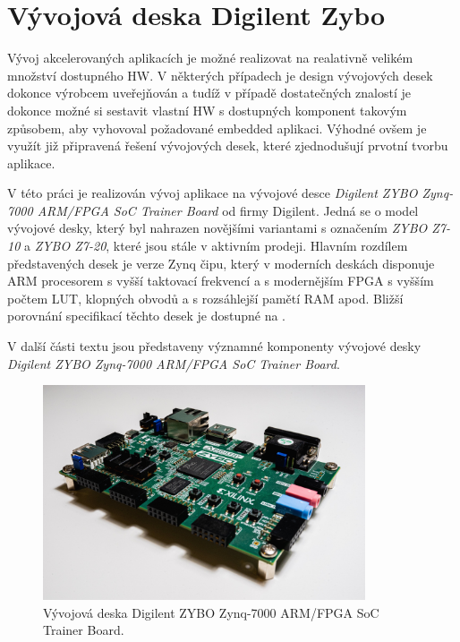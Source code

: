 \documentclass[a4paper, twoside, 11pt]{article}
\begin{document}
	\section{Vývojová deska Digilent Zybo}
			Vývoj akcelerovaných aplikacích je možné realizovat na realativně velikém množství dostupného HW. V některých případech je design vývojových desek dokonce výrobcem uveřejňován a tudíž v případě dostatečných znalostí je dokonce možné si sestavit vlastní HW s dostupných komponent takovým způsobem, aby vyhovoval požadované embedded aplikaci. Výhodné ovšem je využít již připravená řešení vývojových desek, které zjednodušují prvotní tvorbu aplikace.\par
			V této práci je realizován vývoj aplikace na vývojové desce \textit{Digilent ZYBO Zynq-7000 ARM/FPGA SoC Trainer Board} od firmy Digilent. \cite{digilent-zybo-7000-docs} Jedná se o model vývojové desky, který byl nahrazen novějšími variantami s označením \textit{ZYBO Z7-10} a \textit{ZYBO Z7-20}, které jsou stále v aktivním prodeji. Hlavním rozdílem představených desek je verze Zynq čipu, který v moderních deskách disponuje ARM procesorem s vyšší taktovací frekvencí a s modernějším FPGA s vyšším počtem LUT, klopných obvodů a s rozsáhlejší pamětí RAM apod. Bližší porovnání specifikací těchto desek je dostupné na \cite{digilent-zybo-compare}.\par
			V další části textu jsou představeny významné komponenty vývojové desky \textit{Digilent ZYBO Zynq-7000 ARM/FPGA SoC Trainer Board}.

			\begin{figure}[htbp!]
				\centering
					\includegraphics[width=0.85\textwidth]{src/jpg/digilent-zybo-foto-2.jpg} 
					\caption{Vývojová deska Digilent ZYBO Zynq-7000 ARM/FPGA SoC Trainer Board.}
					\label{fig:digilent-zybo-foto-2}
			\end{figure}
\end{document}
